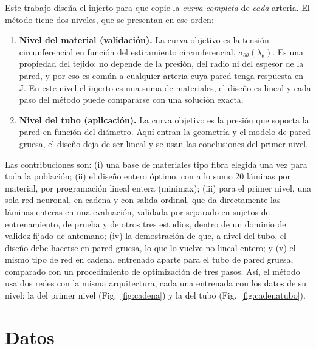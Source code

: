 Este trabajo diseña el injerto para que copie la \emph{curva completa} de \emph{cada} arteria. El método tiene dos niveles, que se presentan en ese orden:
\begin{enumerate}
\item \textbf{Nivel del material (validación).} La curva objetivo es la tensión circunferencial en función del estiramiento circunferencial, $\sigma_{\theta\theta}(\lambda_\theta)$. Es una propiedad del tejido: no depende de la presión, del radio ni del espesor de la pared, y por eso es común a cualquier arteria cuya pared tenga respuesta en J. En este nivel el injerto es una suma de materiales, el diseño es lineal y cada paso del método puede compararse con una solución exacta.
\item \textbf{Nivel del tubo (aplicación).} La curva objetivo es la presión que soporta la pared en función del diámetro. Aquí entran la geometría y el modelo de pared gruesa, el diseño deja de ser lineal y se usan las conclusiones del primer nivel.
\end{enumerate}
Las contribuciones son: (i) una base de materiales tipo fibra elegida una vez para toda la población; (ii) el diseño entero óptimo, con a lo sumo 20 láminas por material, por programación lineal entera (minimax); (iii) para el primer nivel, una sola red neuronal, en cadena y con salida ordinal, que da directamente las láminas enteras en una evaluación, validada por separado en sujetos de entrenamiento, de prueba y de otros tres estudios, dentro de un dominio de validez fijado de antemano; (iv) la demostración de que, a nivel del tubo, el diseño debe hacerse en pared gruesa, lo que lo vuelve no lineal entero; y (v) el mismo tipo de red en cadena, entrenado aparte para el tubo de pared gruesa, comparado con un procedimiento de optimización de tres pasos. Así, el método usa dos redes con la misma arquitectura, cada una entrenada con los datos de su nivel: la del primer nivel (Fig.~\ref{fig:cadena}) y la del tubo (Fig.~\ref{fig:cadenatubo}).

\section{Datos}\label{sec:datos}
